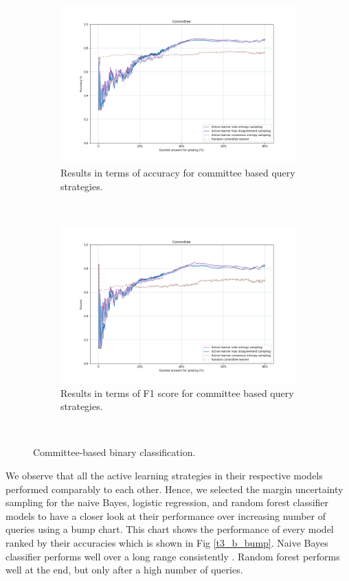 \begin{figure}[!htb]
	\begin{subfigure}[b]{0.5\textwidth}
		\includegraphics[width=\textwidth]{images/binary/task3_accuracy_com}
		\caption{Results in terms of accuracy for committee based query strategies.}
		\label{t3_b_com}
	\end{subfigure}
	~
	\begin{subfigure}[b]{0.5\textwidth}
		\includegraphics[width=\textwidth]{images/binary/task3_f1score_com}
		\caption{Results in terms of F1 score for committee based query strategies.}
		\label{t3_b_com_f1}
	\end{subfigure}
	~
	\caption{Committee-based binary classification.}
\end{figure}

We observe that all the active learning strategies in their respective models performed comparably to each other. Hence, we selected the margin uncertainty sampling for the naive Bayes, logistic regression, and random forest classifier models to have a closer look at their performance over increasing number of queries using a bump chart. This chart shows the performance of every model ranked by their accuracies which is shown in Fig \ref{t3_b_bump}. Naive Bayes classifier performs well over a long range consistently . Random forest performs well at the end, but only after a high number of queries.  

